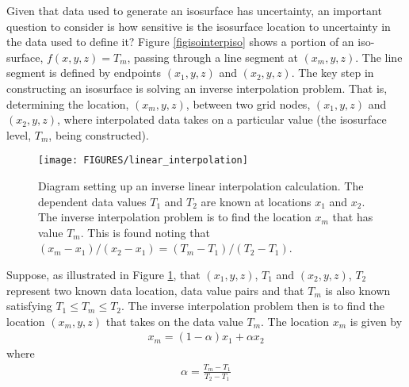 \documentclass[11pt,twoside]{book}
\begin{document}
Given that data used to generate an isosurface has uncertainty, an important question to consider is how sensitive is the isosurface location to uncertainty in the data used to define it? Figure \ref{figisointerpiso} shows a portion of an iso-surface, $f(x,y,z)=T_m$, passing through a line segment at $(x_m,y,z)$. The line segment is defined by endpoints $(x_1,y,z)$ and $(x_2,y,z)$.  The key step in constructing an isosurface is solving an inverse interpolation problem.   That is, determining the location, $(x_m,y,z)$, between two grid nodes, $(x_1,y,z)$ and $(x_2,y,z)$, where interpolated data takes on a particular value (the isosurface level, $T_m$, being constructed).

\begin{figure}[\figoptions]
\begin{center}
\texttt{[image: FIGURES/linear\_interpolation]}
\end{center}
\caption[Diagram setting up an inverse linear interpolation calculation]{Diagram setting up an inverse linear interpolation calculation.  The dependent data values $T_1$ and $T_2$ are known at locations $x_1$ and $x_2$. The inverse interpolation problem is to find the location $x_m$ that has value $T_m$. This is found noting that $(x_m-x_1)/(x_2-x_1)=(T_m-T_1)/(T_2-T_1)$.
 }
\label{figisointerp}%
\end{figure}

Suppose, as illustrated in Figure \ref{figisointerp}, that $(x_1,y,z)$, $T_1$ and $(x_2,y,z)$, $T_2$ represent two known data location, data value pairs and that $T_m$ is also known satisfying $T_1\le T_m \le T_2$.  The inverse interpolation problem then is to find the location $(x_m,y,z)$ that takes on the data value $T_m$.  The location $x_m$ is given by
\begin{eqnarray}
x_m=(1-\alpha)x_1+\alpha x_2
\end{eqnarray}
where
\begin{eqnarray}
\alpha=\frac{T_m-T_1}{T_2-T_1}
\end{eqnarray}
\end{document}
